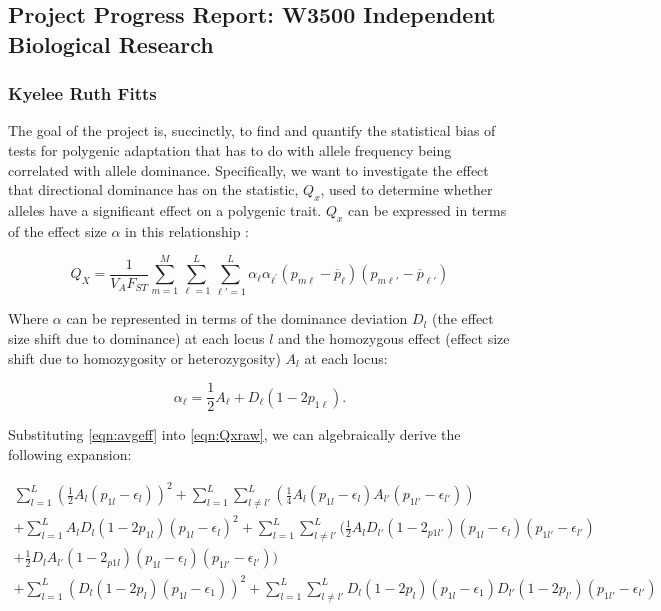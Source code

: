 \documentclass[a4paper,10pt]{article}
\begin{document}
\subsection*{Project Progress Report: W3500 Independent Biological Research}
\subsubsection*{Kyelee Ruth Fitts}

The goal of the project is, succinctly, to find and quantify the
statistical bias of tests for polygenic adaptation that has to do
with allele frequency being correlated with allele
dominance. Specifically, we want to investigate the effect that
directional dominance has on the statistic, $Q_x$, used to determine
whether alleles have a significant effect on a polygenic trait. $Q_x$
can be expressed in terms of the effect size $\alpha$ in this
relationship \cite{gwasintro}:

\begin{equation} \label{eqn:Qxraw}
  Q_X = \frac{1}{V_A F_{ST}} \sum_{m=1}^M \sum_{\ell=1}^L \sum_{\ell\prime=1}^L \alpha_{\ell} \alpha_{\ell^{\prime}}\left(p_{m\ell} - \overline{p}_\ell \right)\left(p_{m \ell\prime} - \overline{p}_{\ell\prime}\right)
\end{equation}

Where $\alpha$ can be represented in terms of the dominance deviation
$D_l$ (the effect size shift due to dominance)  at each locus $l$ and
the homozygous effect (effect size shift due to homozygosity or heterozygosity) $A_l$ at each
locus:

\begin{equation}  \label{eqn:avgeff}
  \alpha_\ell = \frac{1}{2} A_\ell + D_\ell\left(1-2p_{1\ell}\right).
\end{equation}

Substituting \eqref{eqn:avgeff} into \eqref{eqn:Qxraw}, we can
algebraically derive the following expansion:

\begin{equation}
  \begin{split}
  \sum^L_{l=1}( \frac{1}{2}A_l(p_{1l}-\epsilon_l))^2+\sum^L_{l=1}\sum^L_{
    l \neq l'}(\frac{1}{4}A_l(p_{1l}-\epsilon_{l})A_{l'}(p_{1l'}-\epsilon_{l'}))
  \\
  +\sum^L_{l=1}A_lD_l(1-2p_{1l})(p_{1l}-\epsilon_l)^2 +
  \sum^L_{l=1}\sum^L_{l \neq
    l'}(\frac{1}{2}A_lD_{l'}(1-2_{p1l'})(p_{1l}-\epsilon_l)(p_{1l'}-\epsilon_{l'}) \\
  + \frac{1}{2}D_lA_{l'}(1-2_{p1l})(p_{1l}-\epsilon_l)(p_{1l'}-\epsilon_{l'})) \\
   + \sum^L_{l=1} (D_l(1-2p_l)(p_{1l}-\epsilon_{1}))^2
   + \sum^L_{l=1}\sum^L_{l \neq
     l'}D_{l}(1-2p_{l})(p_{1l}-\epsilon_{1})D_{l'}(1-2p_{l'})(p_{1l'}-\epsilon_{l'}) \label{second_exp_ult}
  \end{split}
\end{equation}
\end{document}
